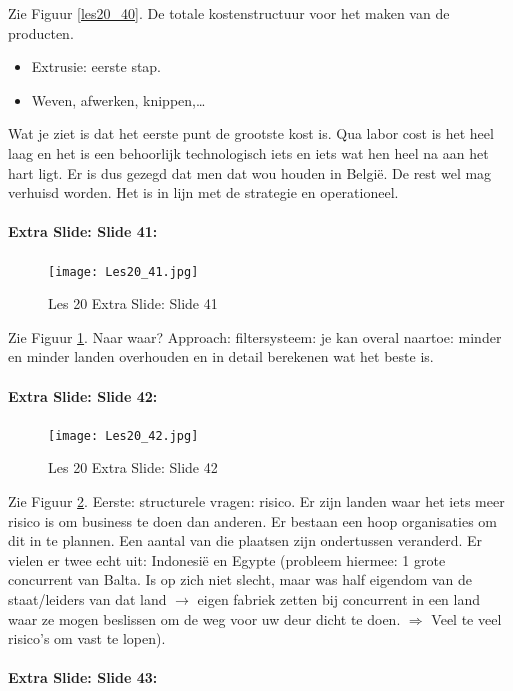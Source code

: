 \documentclass[10pt,a4paper]{report}
\begin{document}
Zie Figuur \ref{les20_40}. De totale kostenstructuur voor het maken van de producten.
\begin{itemize}
\item Extrusie: eerste stap.
\item Weven, afwerken, knippen,…
\end{itemize}
Wat je ziet is dat het eerste punt de grootste kost is. Qua labor cost is het heel laag en het is een behoorlijk technologisch iets en iets wat hen heel na aan het hart ligt. Er is dus gezegd dat men dat wou houden in Belgi\"e. De rest wel mag verhuisd worden. Het is in lijn met de strategie en operationeel.

\paragraph{Extra Slide: Slide 41:}

\begin{figure}[h!]
\centering
\texttt{[image: Les20\_41.jpg]}
\caption{Les 20 Extra Slide: Slide 41} 
\label{les20_41}
\end{figure}

Zie Figuur \ref{les20_41}. Naar waar? Approach: filtersysteem: je kan overal naartoe: minder en minder landen overhouden en in detail berekenen wat het beste is.

\paragraph{Extra Slide: Slide 42:}

\begin{figure}[h!]
\centering
\texttt{[image: Les20\_42.jpg]}
\caption{Les 20 Extra Slide: Slide 42} 
\label{les20_42}
\end{figure}

Zie Figuur \ref{les20_42}. Eerste: structurele vragen: risico. Er zijn landen waar het iets meer risico is om business te doen dan anderen. Er bestaan een hoop organisaties om dit in te plannen. Een aantal van die plaatsen zijn ondertussen veranderd. Er vielen er twee echt uit: Indonesi\"e en Egypte (probleem hiermee: 1 grote concurrent van Balta. Is op zich niet slecht, maar was half eigendom van de staat/leiders van dat land $\rightarrow$ eigen fabriek zetten bij concurrent in een land waar ze mogen beslissen om de weg voor uw deur dicht te doen. $\Rightarrow$ Veel te veel risico's om vast te lopen).

\paragraph{Extra Slide: Slide 43:}
\end{document}
